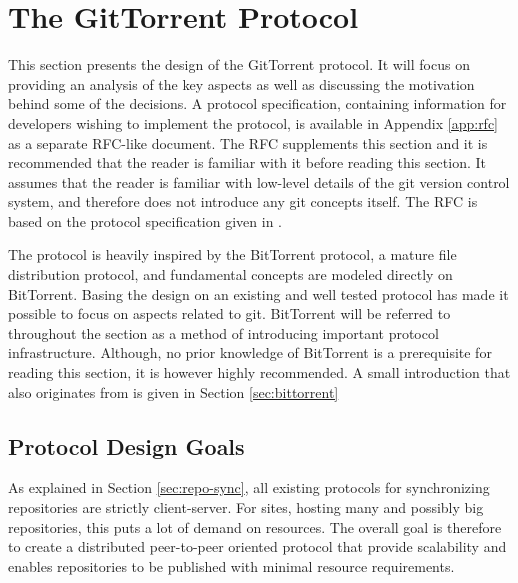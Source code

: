 \section{The GitTorrent Protocol}
\label{sec:protocol}


This section presents the design of the GitTorrent protocol.  It will
focus on providing an analysis of the key aspects as well as
discussing the motivation behind some of the decisions. A protocol
specification, containing information for developers wishing to
implement the protocol, is available in Appendix \ref{app:rfc} as a
separate RFC-like document. The RFC supplements this section and it
is recommended that the reader is familiar with it before reading this section. It assumes that the reader is
familiar with low-level details of the git version control system, and
therefore does not introduce any git concepts itself. The RFC is based
on the protocol specification given in \cite{9}. 

The protocol is heavily inspired by the BitTorrent protocol, a mature
file distribution protocol, and fundamental concepts are modeled
directly on BitTorrent. Basing the design on an existing and well
tested protocol has made it possible to focus on aspects related
to git. BitTorrent will be referred to throughout the section as a
method of introducing important protocol infrastructure.
Although, no prior knowledge of BitTorrent is a prerequisite for
reading this section, it is however highly recommended. A small
introduction that also originates from \cite{9} is given in
Section \ref{sec:bittorrent}


\subsection{Protocol Design Goals}


As explained in Section \ref{sec:repo-sync}, all existing protocols for
synchronizing repositories are strictly client-server. For sites, hosting
many and possibly big repositories, this puts a lot of
demand on resources. The overall goal is therefore to create a
distributed peer-to-peer oriented protocol that provide scalability and enables
repositories to be published with minimal resource requirements.

